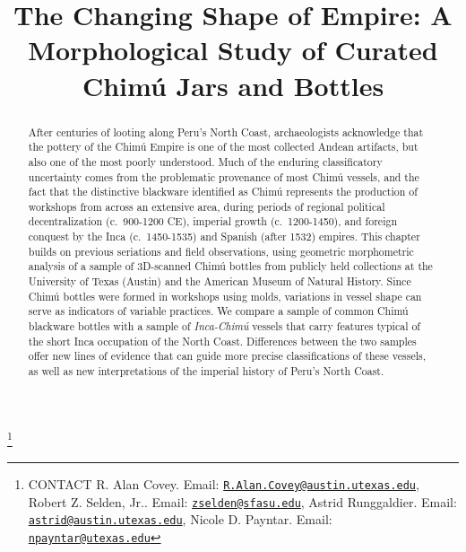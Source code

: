 \documentclass[]{interact}
\theoremstyle{plain}%
\theoremstyle{definition}
\theoremstyle{remark}
\begin{document}

\title{The Changing Shape of Empire: A Morphological Study of Curated
Chimú Jars and Bottles}


\author{
}

\thanks{CONTACT R. Alan
Covey. Email: \href{mailto:R.Alan.Covey@austin.utexas.edu}{\nolinkurl{R.Alan.Covey@austin.utexas.edu}}, Robert
Z. Selden,
Jr.. Email: \href{mailto:zselden@sfasu.edu}{\nolinkurl{zselden@sfasu.edu}}, Astrid
Runggaldier. Email: \href{mailto:astrid@austin.utexas.edu}{\nolinkurl{astrid@austin.utexas.edu}}, Nicole
D.
Payntar. Email: \href{mailto:npayntar@utexas.edu}{\nolinkurl{npayntar@utexas.edu}}}

\maketitle

\begin{abstract}
After centuries of looting along Peru's North Coast, archaeologists
acknowledge that the pottery of the Chimú Empire is one of the most
collected Andean artifacts, but also one of the most poorly understood.
Much of the enduring classificatory uncertainty comes from the
problematic provenance of most Chimú vessels, and the fact that the
distinctive blackware identified as Chimú represents the production of
workshops from across an extensive area, during periods of regional
political decentralization (c.~900-1200 CE), imperial growth
(c.~1200-1450), and foreign conquest by the Inca (c.~1450-1535) and
Spanish (after 1532) empires. This chapter builds on previous seriations
and field observations, using geometric morphometric analysis of a
sample of 3D-scanned Chimú bottles from publicly held collections at the
University of Texas (Austin) and the American Museum of Natural History.
Since Chimú bottles were formed in workshops using molds, variations in
vessel shape can serve as indicators of variable practices. We compare a
sample of common Chimú blackware bottles with a sample of
\emph{Inca-Chimú} vessels that carry features typical of the short Inca
occupation of the North Coast. Differences between the two samples offer
new lines of evidence that can guide more precise classifications of
these vessels, as well as new interpretations of the imperial history of
Peru's North Coast.
\end{abstract}
\end{document}
